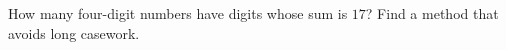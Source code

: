 How many four-digit numbers have digits whose sum is $17$? Find a method that avoids long casework.
